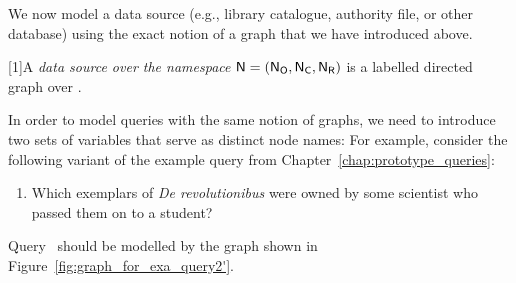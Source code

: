 We now model a data source (e.g., library catalogue, authority file, or other database)
using the exact notion of a graph that we have introduced above.
%
\begin{definition}
  \scalebox{0.973}[1]{A \emph{data source over the namespace $\textup{\textsf{N}}=(\mathsf{N}_\mathsf{O},\mathsf{N}_\mathsf{C},\mathsf{N}_\mathsf{R})$} is a labelled directed graph
  over \namespace.}
\end{definition}
%
%
In order to model queries with the same notion of graphs, we need to introduce
two sets of variables that serve as distinct node names:
For example, consider the following variant of the example query  from Chapter~\ref{chap:prototype_queries}:
%
\begin{enumerate}
  \item[\exaquery{2$'$}]
    Which exemplars of \emph{De revolutionibus} were owned by some scientist who passed them on to a student?
\end{enumerate}
%
Query~
should be modelled by the graph shown in Figure~\ref{fig:graph_for_exa_query2'}.

